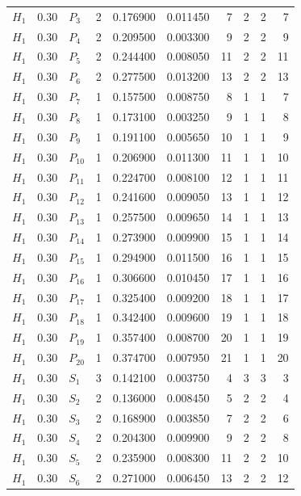 \begin{longtable}{lrlrrrrrrr}
$H_1$ & 0.30 & $P_{3}$ & 2 & 0.176900 & 0.011450 & 7 & 2 & 2 & 7\\
$H_1$ & 0.30 & $P_{4}$ & 2 & 0.209500 & 0.003300 & 9 & 2 & 2 & 9\\
$H_1$ & 0.30 & $P_{5}$ & 2 & 0.244400 & 0.008050 & 11 & 2 & 2 & 11\\
$H_1$ & 0.30 & $P_{6}$ & 2 & 0.277500 & 0.013200 & 13 & 2 & 2 & 13\\
$H_1$ & 0.30 & $P_{7}$ & 1 & 0.157500 & 0.008750 & 8 & 1 & 1 & 7\\
$H_1$ & 0.30 & $P_{8}$ & 1 & 0.173100 & 0.003250 & 9 & 1 & 1 & 8\\
$H_1$ & 0.30 & $P_{9}$ & 1 & 0.191100 & 0.005650 & 10 & 1 & 1 & 9\\
$H_1$ & 0.30 & $P_{10}$ & 1 & 0.206900 & 0.011300 & 11 & 1 & 1 & 10\\
$H_1$ & 0.30 & $P_{11}$ & 1 & 0.224700 & 0.008100 & 12 & 1 & 1 & 11\\
$H_1$ & 0.30 & $P_{12}$ & 1 & 0.241600 & 0.009050 & 13 & 1 & 1 & 12\\
$H_1$ & 0.30 & $P_{13}$ & 1 & 0.257500 & 0.009650 & 14 & 1 & 1 & 13\\
$H_1$ & 0.30 & $P_{14}$ & 1 & 0.273900 & 0.009900 & 15 & 1 & 1 & 14\\
$H_1$ & 0.30 & $P_{15}$ & 1 & 0.294900 & 0.011500 & 16 & 1 & 1 & 15\\
$H_1$ & 0.30 & $P_{16}$ & 1 & 0.306600 & 0.010450 & 17 & 1 & 1 & 16\\
$H_1$ & 0.30 & $P_{17}$ & 1 & 0.325400 & 0.009200 & 18 & 1 & 1 & 17\\
$H_1$ & 0.30 & $P_{18}$ & 1 & 0.342400 & 0.009600 & 19 & 1 & 1 & 18\\
$H_1$ & 0.30 & $P_{19}$ & 1 & 0.357400 & 0.008700 & 20 & 1 & 1 & 19\\
$H_1$ & 0.30 & $P_{20}$ & 1 & 0.374700 & 0.007950 & 21 & 1 & 1 & 20\\
$H_1$ & 0.30 & $S_{1}$ & 3 & 0.142100 & 0.003750 & 4 & 3 & 3 & 3\\
$H_1$ & 0.30 & $S_{2}$ & 2 & 0.136000 & 0.008450 & 5 & 2 & 2 & 4\\
$H_1$ & 0.30 & $S_{3}$ & 2 & 0.168900 & 0.003850 & 7 & 2 & 2 & 6\\
$H_1$ & 0.30 & $S_{4}$ & 2 & 0.204300 & 0.009900 & 9 & 2 & 2 & 8\\
$H_1$ & 0.30 & $S_{5}$ & 2 & 0.235900 & 0.008300 & 11 & 2 & 2 & 10\\
$H_1$ & 0.30 & $S_{6}$ & 2 & 0.271000 & 0.006450 & 13 & 2 & 2 & 12\\

\end{longtable}
